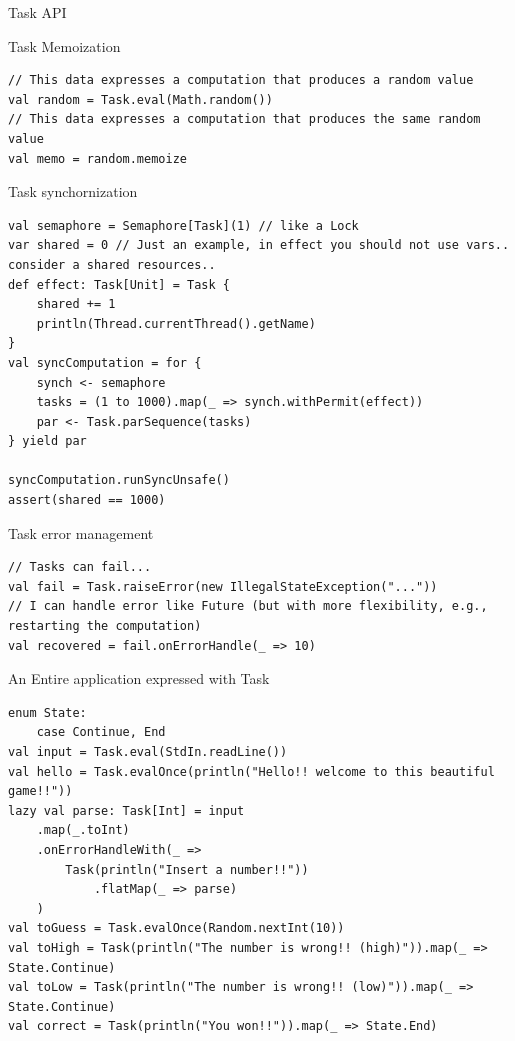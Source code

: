\documentclass[presentation, 9pt]{beamer}\mode<presentation>{\usetheme{AMSBolognaFC}}
\begin{document}
\begin{frame}{Task API}
\begin{alertblock}{Task Memoization}
\begin{tcolorbox}[left=0pt, top=0pt, bottom=0pt]
\begin{verbatim}
// This data expresses a computation that produces a random value
val random = Task.eval(Math.random())
// This data expresses a computation that produces the same random value
val memo = random.memoize
								 \end{verbatim}
							 \end{tcolorbox}
					 \end{alertblock}
					 \begin{alertblock}{Task synchornization}
						\begin{tcolorbox}[left=0pt, top=0pt, bottom=0pt]
									 \begin{verbatim}
val semaphore = Semaphore[Task](1) // like a Lock
var shared = 0 // Just an example, in effect you should not use vars.. consider a shared resources..
def effect: Task[Unit] = Task {
	shared += 1
	println(Thread.currentThread().getName)
}
val syncComputation = for {
	synch <- semaphore
	tasks = (1 to 1000).map(_ => synch.withPermit(effect))
	par <- Task.parSequence(tasks)
} yield par

syncComputation.runSyncUnsafe()
assert(shared == 1000)
									 \end{verbatim}
								 \end{tcolorbox}
						 \end{alertblock}
\begin{alertblock}{Task error management}
	\begin{tcolorbox}[left=0pt, top=0pt, bottom=0pt]
										 \begin{verbatim}
// Tasks can fail...
val fail = Task.raiseError(new IllegalStateException("..."))
// I can handle error like Future (but with more flexibility, e.g., restarting the computation)
val recovered = fail.onErrorHandle(_ => 10)
										 \end{verbatim}
									 \end{tcolorbox}
							 \end{alertblock}
\begin{alertblock}{An Entire application expressed with Task}
	\begin{tcolorbox}[left=0pt, top=0pt, bottom=0pt]
					\begin{verbatim}
enum State:
	case Continue, End
val input = Task.eval(StdIn.readLine())
val hello = Task.evalOnce(println("Hello!! welcome to this beautiful game!!"))
lazy val parse: Task[Int] = input
	.map(_.toInt)
	.onErrorHandleWith(_ =>
		Task(println("Insert a number!!"))
			.flatMap(_ => parse)
	)
val toGuess = Task.evalOnce(Random.nextInt(10))
val toHigh = Task(println("The number is wrong!! (high)")).map(_ => State.Continue)
val toLow = Task(println("The number is wrong!! (low)")).map(_ => State.Continue)
val correct = Task(println("You won!!")).map(_ => State.End)


\end{verbatim}
\end{tcolorbox}
\end{alertblock}
\end{frame}
\end{document}
